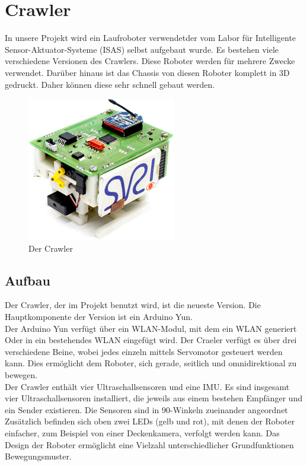 \section{Crawler}
In unsere Projekt wird ein Laufroboter verwendetder vom Labor für Intelligente Sensor-Aktuator-Systeme (ISAS) selbst aufgebaut wurde. Es bestehen viele verschiedene Versionen des Crawlers. Diese Roboter werden für mehrere Zwecke verwendet. Darüber hinaus ist das Chassis von diesen
Roboter komplett in 3D gedruckt. Daher können diese sehr schnell gebaut werden.


\begin{figure}[b!]
	\centering
	\includegraphics[width=0.5\linewidth]{Images/crawler}
	\caption{Der Crawler}
	\label{fig:crawler}
\end{figure}

\subsection{Aufbau}
Der Crawler, der im Projekt benutzt wird, ist die neueste Version. Die Hauptkomponente der Version ist ein Arduino Yun.
\\Der Arduino Yun verfügt über ein WLAN-Modul, mit dem ein WLAN generiert Oder in ein bestehendes WLAN eingefügt wird. Der Craeler verfügt es über drei verschiedene Beine, wobei jedes einzeln mittels Servomotor gesteuert werden kann. Dies ermöglicht dem Roboter, sich gerade, seitlich und omnidirektional zu bewegen.
\\Der Crawler enthält vier Ultraschallsensoren und eine IMU. Es sind insgesamt vier Ultraschallsensoren installiert, die jeweils aus einem bestehen Empfänger und ein Sender existieren.  Die Sensoren sind in 90-Winkeln zueinander angeordnet
\\Zusätzlich befinden sich oben zwei LEDs (gelb und rot), mit denen der
Roboter einfacher, zum Beispiel von einer Deckenkamera, verfolgt werden kann.
Das Design der Roboter ermöglicht eine Vielzahl unterschiedlicher Grundfunktionen Bewegungsmuster.










